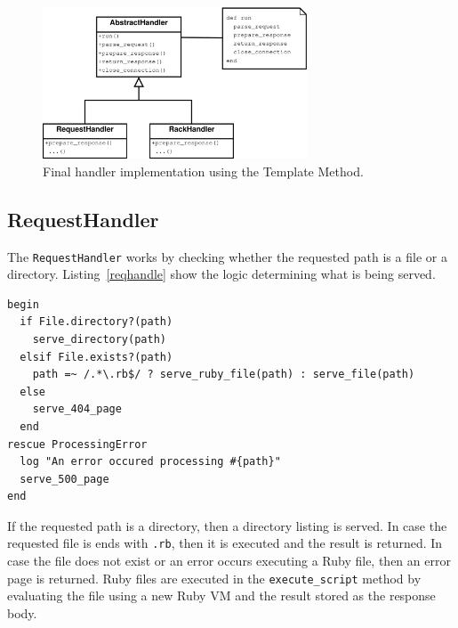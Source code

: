 \begin{figure}[htb]
  \centering
  \includegraphics[width=0.7\textwidth]{diagrams/handlers2.pdf}
  \caption{Final handler implementation using the Template Method.}
  \label{template2}
\end{figure}

\subsection{RequestHandler}
\label{reqhandler}
The \texttt{RequestHandler} works by checking whether the requested path is a
file or a directory. Listing~\ref{reqhandle} show the logic
determining what is being served.

\begin{lstlisting}[label=reqhandle,caption=\texttt{RequestHandler} logic.
(lib/yarn/request\_handler.rb:8)]
begin
  if File.directory?(path)
    serve_directory(path)
  elsif File.exists?(path)
    path =~ /.*\.rb$/ ? serve_ruby_file(path) : serve_file(path)
  else
    serve_404_page
  end
rescue ProcessingError
  log "An error occured processing #{path}"
  serve_500_page
end
\end{lstlisting}

If the requested path is a directory, then a directory listing is served. In
case the requested file is ends with \texttt{.rb}, then it is executed and the
result is returned. In case the file does not exist or an error occurs
executing a Ruby file, then an error page is returned. Ruby files are executed
in the \texttt{execute\_script} method by evaluating the file using a new Ruby
VM and the result stored as the response body.


